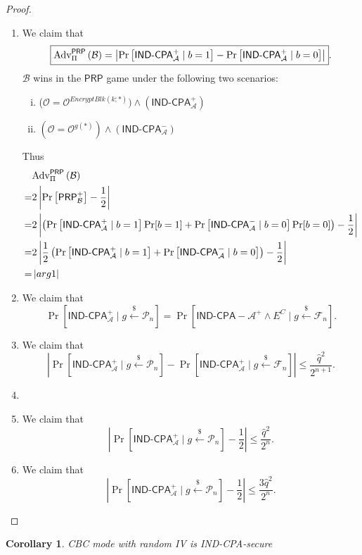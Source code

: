 \documentclass[12pt,openany]{book}
\newtheorem{corollary}{Corollary}[theorem]
\theoremstyle{definition}
\newcommand{\of}[1]{\left( #1 \right)}
\newcommand{\abs}[1]{\left\lvert #1 \right\rvert}
\newcommand{\dollar}{\$}
\newcommand{\uniform}{\xleftarrow{\dollar}}
\newcommand{\A}{\mathcal{A}}
\newcommand{\B}{\mathcal{B}}
\newcommand{\oracle}{\mathcal{O}}
\newcommand{\IND}{\mathsf{IND}}
\newcommand{\PRP}{\mathsf{PRP}}
\newcommand{\CPA}{\mathsf{CPA}}
\newcommand{\Adv}{\textnormal{Adv}}
\begin{document}
\begin{proof}
		\begin{enumerate}
			\item We claim that \[
			\boxed{\Adv_{\Pi}^{\PRP}\of{\mathcal{B}}=\abs{\Pr\left[\IND\text{-}\CPA_\A^+\mid b=1\right]-\Pr\left[\IND\text{-}\CPA_{\A}^+\mid b=0\right]}}.
			\] 
			$\B$ wins in the $\PRP$ game under the following two scenarios: \begin{enumerate}[(i)]
				\item ($\oracle=\oracle^{EncryptBlk(k;*)})\land(\IND\text{-}\CPA_\A^+)$
				\item $(\oracle=\oracle^{g(*)})\land (\IND\text{-}\CPA_\A^-)$
			\end{enumerate} Thus \begin{align*}
				&\Adv_{\Pi}^{\PRP}\of{\B}\\
				=&2\abs{\Pr\left[\PRP_{\B}^+\right]-\frac{1}{2}}\\
				=&2\abs{\of{\Pr\left[\IND\text{-}\CPA_{\A}^+\mid b=1\right]\Pr[b=1]+\Pr\left[\IND\text{-}\CPA_{\A}^-\mid b=0\right]\Pr[b=0]}-\frac{1}{2}}\\
				=&2\abs{\frac{1}{2}\of{\Pr\left[\IND\text{-}\CPA_{\A}^+\mid b=1\right]+\Pr\left[\IND\text{-}\CPA_{\A}^-\mid b=0\right]}-\frac{1}{2}}\\
				=&\abs{arg1}
			\end{align*}
			\vspace{4pt}
			\item We claim that \[
			\boxed{\Pr\left[\IND\text{-}\CPA_{\A}^+\mid g\uniform\mathcal{P}_n\right]=\Pr\left[\IND\text{-}\CPA-\A^+\land E^C\mid g\uniform\mathcal{F}_n\right]}.
			\]
			\item We claim that \[
			\boxed{\abs{\Pr\left[\IND\text{-}\CPA_{\A}^+\mid g\uniform\mathcal{P}_n\right]-\Pr\left[\IND\text{-}\CPA_{\A}^+\mid g\uniform\mathcal{F}_n\right]}\leq\frac{\hat{q}^2}{2^{n+1}}}.
			\]
			\item 
			\item We claim that \[
			\boxed{\abs{\Pr\left[\IND\text{-}\CPA_{\A}^+\mid g\uniform\mathcal{P}_n\right]-\frac{1}{2}}\leq\frac{\hat{q}^2}{2^{n}}}.
			\]
			\item We claim that \[
			\boxed{\abs{\Pr\left[\IND\text{-}\CPA_{\A}^+\mid g\uniform\mathcal{P}_n\right]-\frac{1}{2}}\leq\frac{3\hat{q}^2}{2^{n}}}.
			\]
		\end{enumerate}
	\end{proof}
	\begin{tcolorbox}[colback=white,colframe=corcolor, title={\color{white}\bf }]
		\begin{corollary}
			CBC mode with random IV is IND-CPA-secure
		\end{corollary}
	\end{tcolorbox}
\end{document}
